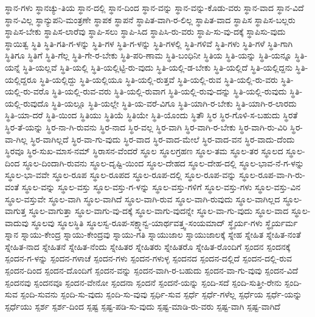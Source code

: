 {ಸ್ಥಾನ-ಗಳು
ಸ್ಥಾನಚ್ಯು-ತಿಯ
ಸ್ಥಾನ-ದಲ್ಲಿ
ಸ್ಥಾನ-ದಿಂದ
ಸ್ಥಾನ-ವನ್ನು
ಸ್ಥಾನ-ವನ್ನು-ಕೊಡು-ವರು
ಸ್ಥಾನ-ವಾದ
ಸ್ಥಾನ-ವಿದೆ
ಸ್ಥಾನ-ವಿಲ್ಲ
ಸ್ಥಾನ್ಯುಪನಿ-ಮಂತ್ರಣೇ
ಸ್ಥಾಪಕ
ಸ್ಥಾಪನೆ
ಸ್ಥಾಪಿತ-ವಾಗಿ-ರ-ಲಿಲ್ಲ
ಸ್ಥಾಪಿತ-ವಾದ
ಸ್ಥಾಪಿಸ
ಸ್ಥಾಪಿಸ-ಬಲ್ಲರು
ಸ್ಥಾಪಿಸ-ಬೇಕು
ಸ್ಥಾಪಿಸ-ಲಾರೆವು
ಸ್ಥಾಪಿ-ಸಲು
ಸ್ಥಾಪಿ-ಸಿದ
ಸ್ಥಾಪಿಸಿ-ರು-ವರು
ಸ್ಥಾಪಿ-ಸು-ವು-ದಕ್ಕೆ
ಸ್ಥಾಪಿಸು-ವುದು
ಸ್ಥಾಯಿತ್ವ
ಸ್ಥಿತಿ
ಸ್ಥಿತಿ-ಗತಿ-ಗ-ಳನ್ನು
ಸ್ಥಿತಿ-ಗಳ
ಸ್ಥಿತಿ-ಗ-ಳನ್ನು
ಸ್ಥಿತಿ-ಗಳಲ್ಲಿ
ಸ್ಥಿತಿ-ಗಳಿವೆ
ಸ್ಥಿತಿ-ಗಳು
ಸ್ಥಿತಿ-ಗಳೆ
ಸ್ಥಿತಿ-ಗಾಗಿ
ಸ್ಥಿತಿಗೂ
ಸ್ಥಿತಿಗೆ
ಸ್ಥಿತಿ-ಗೆಲ್ಲ
ಸ್ಥಿತಿ-ಗೇ-ರ-ಬೇಕು
ಸ್ಥಿತಿ-ಪರಿ-ಣಾಮ
ಸ್ಥಿತಿ-ಬಂಧಿನೀ
ಸ್ಥಿತಿಯ
ಸ್ಥಿತಿ-ಯನ್ನು
ಸ್ಥಿತಿ-ಯನ್ನೂ
ಸ್ಥಿತಿ-ಯನ್ನೆ
ಸ್ಥಿತಿ-ಯಲ್ಲವೆ
ಸ್ಥಿತಿ-ಯಲ್ಲಿ
ಸ್ಥಿತಿ-ಯಲ್ಲಿಟ್ಟಿ-ರು-ವುದು
ಸ್ಥಿತಿ-ಯಲ್ಲಿ-ಡ-ಬೇಕು
ಸ್ಥಿತಿ-ಯಲ್ಲಿದೆ
ಸ್ಥಿತಿ-ಯಲ್ಲಿದ್ದನು
ಸ್ಥಿತಿ-ಯಲ್ಲಿದ್ದರೂ
ಸ್ಥಿತಿ-ಯಲ್ಲಿದ್ದು
ಸ್ಥಿತಿ-ಯಲ್ಲಿಯೂ
ಸ್ಥಿತಿ-ಯಲ್ಲಿ-ರುತ್ತವೆ
ಸ್ಥಿತಿ-ಯಲ್ಲಿ-ರುವ
ಸ್ಥಿತಿ-ಯಲ್ಲಿ-ರು-ವರು
ಸ್ಥಿತಿ-ಯಲ್ಲಿ-ರು-ವರೊ
ಸ್ಥಿತಿ-ಯಲ್ಲಿ-ರುವ-ವರು
ಸ್ಥಿತಿ-ಯಲ್ಲಿ-ರುವಾಗ
ಸ್ಥಿತಿ-ಯಲ್ಲಿ-ರುವು-ದನ್ನು
ಸ್ಥಿತಿ-ಯಲ್ಲಿ-ರುವುದು
ಸ್ಥಿತಿ-ಯಲ್ಲಿ-ರುವುದೊ
ಸ್ಥಿತಿ-ಯಲ್ಲೂ
ಸ್ಥಿತಿ-ಯಲ್ಲೇ
ಸ್ಥಿತಿ-ಯ-ವರೆ-ವಿಗೂ
ಸ್ಥಿತಿ-ಯಾಗಿ-ರ-ಬೇಕು
ಸ್ಥಿತಿ-ಯಾಗಿ-ರ-ಲಾರದು
ಸ್ಥಿತಿ-ಯಾ-ದರೆ
ಸ್ಥಿತಿ-ಯಿಂದ
ಸ್ಥಿತಿಯು
ಸ್ಥಿತಿಯೆ
ಸ್ಥಿತಿಯೇ
ಸ್ಥಿತಿ-ಯೊಂದು
ಸ್ಥಿತೌ
ಸ್ಥಿರ
ಸ್ಥಿರ-ಗೊಳಿ-ಸ-ಬಹುದು
ಸ್ಥಿರತೆ
ಸ್ಥಿರ-ತೆ-ಯನ್ನು
ಸ್ಥಿರ-ನಾ-ಗಿ-ರುವನು
ಸ್ಥಿರ-ನಾದ
ಸ್ಥಿರ-ವಲ್ಲ
ಸ್ಥಿರ-ವಾಗಿ
ಸ್ಥಿರ-ವಾಗಿ-ರ-ಬೇಕು
ಸ್ಥಿರ-ವಾಗಿ-ರು-ವಿರಿ
ಸ್ಥಿರ-ವಾ-ಗಿಲ್ಲ
ಸ್ಥಿರ-ವಾಗಿಲ್ಲದೆ
ಸ್ಥಿರ-ವಾ-ಗು-ವುದು
ಸ್ಥಿರ-ವಾದ
ಸ್ಥಿರ-ವಾದ-ಮೇಲೆ
ಸ್ಥಿರ-ವಾದ-ವನ
ಸ್ಥಿರ-ವಾದು-ದೆಂದು
ಸ್ಥಿರವೂ
ಸ್ಥಿರ-ಸುಖ-ಮಾಸ-ನಮ್
ಸ್ಥಿರಾಸನ-ವೆಂದರೆ
ಸ್ಥೂಲ
ಸ್ಥೂಲಗ್ರಹಣ
ಸ್ಥೂಲ-ತಮ
ಸ್ಥೂಲ-ತರ
ಸ್ಥೂಲದ
ಸ್ಥೂಲ-ದಿಂದ
ಸ್ಥೂಲ-ದಿಂದಾಗಿ-ರುವನು
ಸ್ಥೂಲ-ದೃಷ್ಟಿ-ಯಿಂದ
ಸ್ಥೂಲ-ದೇಹದ
ಸ್ಥೂಲ-ದೇಹ-ದಲ್ಲಿ
ಸ್ಥೂಲ-ಭಾವ-ನೆ-ಗ-ಳನ್ನು
ಸ್ಥೂಲ-ಭಾ-ವವೇ
ಸ್ಥೂಲ-ರೂಪ
ಸ್ಥೂಲ-ರೂಪದ
ಸ್ಥೂಲ-ರೂಪ-ದಲ್ಲಿ
ಸ್ಥೂಲ-ರೂಪ-ವನ್ನು
ಸ್ಥೂಲ-ರೂಪ-ವಾ-ಗಿ-ರು-ವಂತೆ
ಸ್ಥೂಲ-ವನ್ನು
ಸ್ಥೂಲ-ವಸ್ತು
ಸ್ಥೂಲ-ವಸ್ತು-ಗ-ಳನ್ನು
ಸ್ಥೂಲ-ವಸ್ತು-ಗಳಿಗೆ
ಸ್ಥೂಲ-ವಸ್ತು-ಗಳು
ಸ್ಥೂಲ-ವಸ್ತು-ವಿನ
ಸ್ಥೂಲ-ವಸ್ತುವೇ
ಸ್ಥೂಲ-ವಾಗಿ
ಸ್ಥೂಲ-ವಾಗಿದೆ
ಸ್ಥೂಲ-ವಾಗಿ-ರುವ
ಸ್ಥೂಲ-ವಾಗಿ-ರುವುದು
ಸ್ಥೂಲ-ವಾಗಿಲ್ಲದ
ಸ್ಥೂಲ-ವಾಗುತ್ತ
ಸ್ಥೂಲ-ವಾಗುತ್ತಾ
ಸ್ಥೂಲ-ವಾಗು-ವು-ದಕ್ಕೆ
ಸ್ಥೂಲ-ವಾಗು-ವುದನ್ನೇ
ಸ್ಥೂಲ-ವಾ-ಗು-ವುದು
ಸ್ಥೂಲ-ವಾದ
ಸ್ಥೂಲ-ವಾದುವು
ಸ್ಥೂಲವು
ಸ್ಥೂಲಸ್ಥಿತಿ
ಸ್ಥೂಲಸ್ವ-ರೂಪ-ಸಕ್ಷ್ಮಾನ್ವ-ಯಾರ್ಥವತ್ತ್ವ-ಸಂಯಮಾದ್
ಸ್ಥೈರ್ಯ-ಗಳು
ಸ್ಥೈರ್ಯರ್ಮ
ಸ್ನಾನ
ಸ್ನಾಯು-ಕೇಂದ್ರ
ಸ್ನಾಯು-ಕೇಂದ್ರವು
ಸ್ನಾಯು-ಗತಿ
ಸ್ನಾಯುಜಾಲ
ಸ್ನಾಯುಜಾಲಕ್ಕೆ
ಸ್ನೇಹ
ಸ್ನೇಹಿತ
ಸ್ನೇಹಿತ-ನಂತೆ
ಸ್ನೇಹಿತ-ನಾದ
ಸ್ನೇಹಿತನೆ
ಸ್ನೇಹಿತ-ನೆಂದು
ಸ್ನೇಹಿತರ
ಸ್ನೇಹಿತರು
ಸ್ನೇಹಿತರೊ
ಸ್ನೇಹಿತ-ರೊಂದಿಗೆ
ಸ್ಪಂದನ
ಸ್ಪಂದನಕ್ಕೆ
ಸ್ಪಂದನ-ಗ-ಳನ್ನು
ಸ್ಪಂದನ-ಗಳಾಚೆ
ಸ್ಪಂದನ-ಗಳು
ಸ್ಪಂದನ-ಗಳುಳ್ಳ
ಸ್ಪಂದನದ
ಸ್ಪಂದನ-ದಲ್ಲಿದೆ
ಸ್ಪಂದನ-ದಲ್ಲಿ-ರುವ
ಸ್ಪಂದನ-ದಿಂದ
ಸ್ಪಂದನ-ದೊಂದಿಗೆ
ಸ್ಪಂದನ-ವನ್ನು
ಸ್ಪಂದನ-ವಾಗಿ-ರ-ಬಹುದು
ಸ್ಪಂದನ-ವಾ-ಗು-ವುವು
ಸ್ಪಂದನ-ವಿದೆ
ಸ್ಪಂದನವು
ಸ್ಪಂದನವೂ
ಸ್ಪಂದನ-ವೇನೋ
ಸ್ಪಂದನಾ
ಸ್ಪಂದನೆ
ಸ್ಪಂದನೆ-ಯನ್ನು
ಸ್ಪಂದಿ-ಸದೆ
ಸ್ಪಂದಿ-ಸುತ್ತೀ-ರೇನು
ಸ್ಪಂದಿ-ಸುವ
ಸ್ಪಂದಿ-ಸುವನು
ಸ್ಪಂದಿ-ಸು-ವುದು
ಸ್ಪಂದಿ-ಸು-ವುವು
ಸ್ಪರ್ಧಿ-ಸುವ
ಸ್ಪರ್ಧೆ
ಸ್ಪರ್ಧೆ-ಗಳೆಲ್ಲ
ಸ್ಪರ್ಧೆಯ
ಸ್ಪರ್ಧೆ-ಯನ್ನು
ಸ್ಪರ್ಧೆಯು
ಸ್ಪರ್ಶ
ಸ್ಪರ್ಶ-ದಿಂದ
ಸ್ಪಷ್ಟ
ಸ್ಪಷ್ಟ-ಪಡಿ-ಸು-ವುದು
ಸ್ಪಷ್ಟ-ಮಾಡಿ-ರು-ವರು
ಸ್ಪಷ್ಟ-ವಾಗಿ
ಸ್ಪಷ್ಟ-ವಾಗಿದೆ
}
